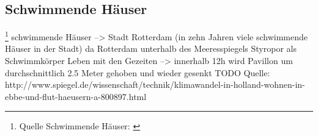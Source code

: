 \subsection{Schwimmende Häuser} \footnote{Quelle Schwimmende Häuser: \cite{schwimmende_haeuser}}
schwimmende Häuser
--> Stadt Rotterdam	(in zehn Jahren viele schwimmende Häuser in der Stadt)
da Rotterdam unterhalb des Meeresspiegels
\newline\newline
Styropor als Schwimmkörper
\newline\newline
Leben mit den Gezeiten
--> innerhalb 12h wird Pavillon um durchschnittlich 2.5 Meter gehoben und wieder gesenkt
\newline\newline
TODO
Quelle: http://www.spiegel.de/wissenschaft/technik/klimawandel-in-holland-wohnen-in-ebbe-und-flut-haeusern-a-800897.html